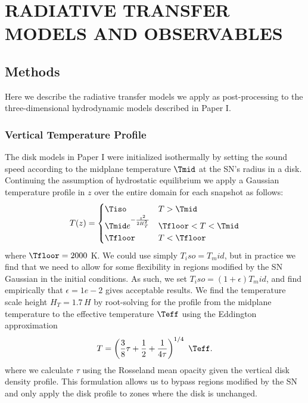 \section{\texorpdfstring{\MakeUppercase{radiative transfer models and observables}}{radiative transfer models and observables}}
\label{sec:sn-rt}



\subsection{Methods} \label{sec:methods}

Here we describe the radiative transfer models we apply as post-processing to the three-dimensional hydrodynamic models described in Paper I. 



\subsubsection{Vertical Temperature Profile} \label{subsec:temperature-profile}

The disk models in Paper I were initialized isothermally by setting the sound speed according to the midplane temperature $\Tmid$ at the SN's radius in a \citet{SirkoGoodman03} disk.
Continuing the assumption of hydrostatic equilibrium we apply a Gaussian temperature profile in $z$ over the entire domain for each snapshot as follows:
\begin{equation}
\label{eqn:temp-profile}
    T(z) =
    \begin{cases}
	\Tiso & T>\Tmid \\
	\Tmid e^{- \frac{z^2}{2 H_T^2}} & \Tfloor < T < \Tmid \\
	\Tfloor & T<\Tfloor
    \end{cases}
\end{equation}
where $\Tfloor=2000$ K.
We could use simply $T_iso = T_mid$, but in practice we find that we need to allow for some flexibility in regions modified by the SN Gaussian in the initial conditions.
As such, we set $T_iso = (1+\epsilon) T_mid$, and find empirically that $\epsilon=1e-2$ gives acceptable results.
We find the temperature scale height $H_T=1.7\,H$ by root-solving for the profile from the midplane temperature to the effective temperature $\Teff$ using the Eddington approximation
\begin{equation}
	T = \left( \frac{3}{8} \tau + \frac{1}{2} + \frac{1}{4\tau} \right)^{1/4}\ \Teff.
\end{equation}
where we calculate $\tau$ using the Rosseland mean opacity given the vertical disk density profile.
This formulation allows us to bypass regions modified by the SN and only apply the disk profile to zones where the disk is unchanged.



